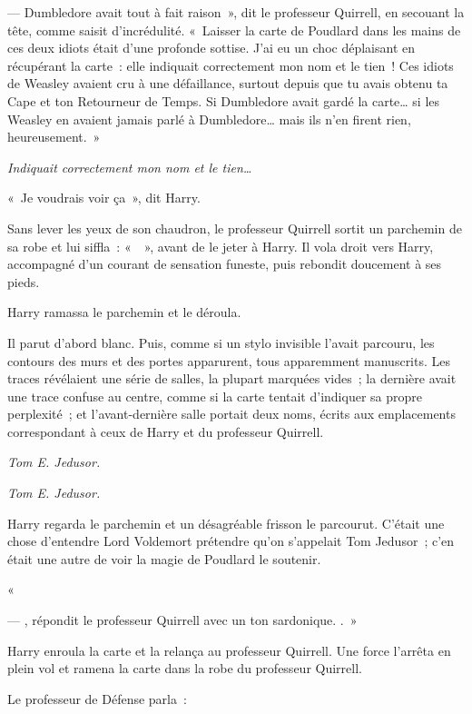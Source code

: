 --- Dumbledore avait tout à fait raison~», dit le professeur Quirrell, en secouant la tête, comme saisit d'incrédulité. «~Laisser la carte de Poudlard dans les mains de ces deux idiots était d'une profonde sottise. J'ai eu un choc déplaisant en récupérant la carte~: elle indiquait correctement mon nom et le tien~! Ces idiots de Weasley avaient cru à une défaillance, surtout depuis que tu avais obtenu ta Cape et ton Retourneur de Temps. Si Dumbledore avait gardé la carte… si les Weasley en avaient jamais parlé à Dumbledore… mais ils n'en firent rien, heureusement.~»

\emph{Indiquait correctement mon nom et le tien…}

«~Je voudrais voir ça~», dit Harry.

Sans lever les yeux de son chaudron, le professeur Quirrell sortit un parchemin de sa robe et lui siffla~: «~~», avant de le jeter à Harry. Il vola droit vers Harry, accompagné d'un courant de sensation funeste, puis rebondit doucement à ses pieds.

Harry ramassa le parchemin et le déroula.

Il parut d'abord blanc. Puis, comme si un stylo invisible l'avait parcouru, les contours des murs et des portes apparurent, tous apparemment manuscrits. Les traces révélaient une série de salles, la plupart marquées vides~; la dernière avait une trace confuse au centre, comme si la carte tentait d'indiquer sa propre perplexité~; et l'avant-dernière salle portait deux noms, écrits aux emplacements correspondant à ceux de Harry et du professeur Quirrell.

\emph{Tom E. Jedusor.}

\emph{Tom E. Jedusor.}

Harry regarda le parchemin et un désagréable frisson le parcourut. C'était une chose d'entendre Lord Voldemort prétendre qu'on s'appelait Tom Jedusor~; c'en était une autre de voir la magie de Poudlard le soutenir.

«~

--- , répondit le professeur Quirrell avec un ton sardonique. .~»

Harry enroula la carte et la relança au professeur Quirrell. Une force l'arrêta en plein vol et ramena la carte dans la robe du professeur Quirrell.

Le professeur de Défense parla~:

